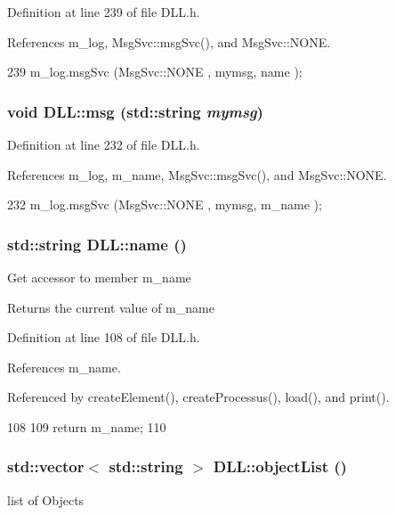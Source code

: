 Definition at line 239 of file DLL.h.

References m\_\-log, MsgSvc::msgSvc(), and MsgSvc::NONE.


\begin{DoxyCode}
239 { m_log.msgSvc (MsgSvc::NONE    , mymsg, name ); }
\end{DoxyCode}
\hypertarget{classDLL_a3a4774ae240e805b9c3ce18b7418d7cc}{
\subsubsection[{msg}]{\setlength{\rightskip}{0pt plus 5cm}void DLL::msg (std::string {\em mymsg})}}
\label{classDLL_a3a4774ae240e805b9c3ce18b7418d7cc}


Definition at line 232 of file DLL.h.

References m\_\-log, m\_\-name, MsgSvc::msgSvc(), and MsgSvc::NONE.


\begin{DoxyCode}
232 { m_log.msgSvc (MsgSvc::NONE    , mymsg, m_name ); }
\end{DoxyCode}
\hypertarget{classDLL_a0a915d538771dde2cb0580cd340ee088}{
\subsubsection[{name}]{\setlength{\rightskip}{0pt plus 5cm}std::string DLL::name ()}}
\label{classDLL_a0a915d538771dde2cb0580cd340ee088}
Get accessor to member m\_\-name \begin{DoxyReturn}{Returns}
the current value of m\_\-name 
\end{DoxyReturn}


Definition at line 108 of file DLL.h.

References m\_\-name.

Referenced by createElement(), createProcessus(), load(), and print().


\begin{DoxyCode}
108                     {
109     return m_name;
110   }
\end{DoxyCode}
\hypertarget{classDLL_a7d378e5aceb5b06e0fd7df6bc07f9ee5}{
\subsubsection[{objectList}]{\setlength{\rightskip}{0pt plus 5cm}std::vector$<$ std::string $>$ DLL::objectList ()}}
\label{classDLL_a7d378e5aceb5b06e0fd7df6bc07f9ee5}
list of Objects 


